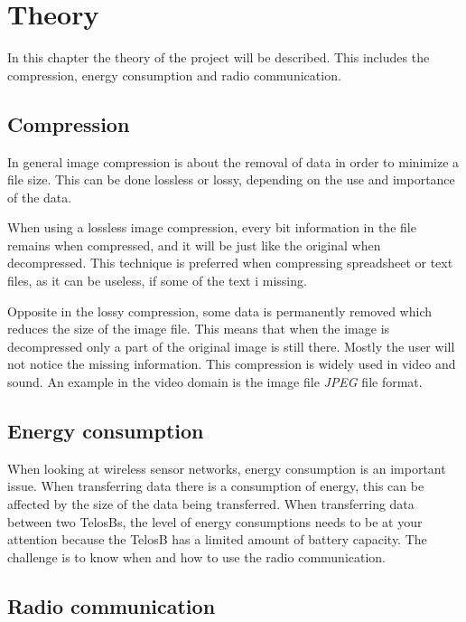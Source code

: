 \chapter{Theory}
\label{chp:theory}

In this chapter the theory of the project will be described. This includes the compression, energy consumption and radio communication.

\section{Compression}
In general image compression is about the removal of data in order to minimize a file size. This can be done lossless or lossy, depending on the use and importance of the data.

When using a lossless image compression, every bit information in the file remains when compressed, and it will be just like the original when decompressed. This technique is preferred when compressing spreadsheet or text files, as it can be useless, if some of the text i missing.

Opposite in the lossy compression, some data is permanently removed which reduces the size of the image file. This means that when the image is decompressed only a part of the original image is still there. Mostly the user will not notice the missing information. This compression is widely used in video and sound. An example in the video domain is the image file \emph{JPEG} file format.

\section{Energy consumption}
When looking at wireless sensor networks, energy consumption is an important issue. When transferring data there is a consumption of energy, this can be affected by the size of the data being transferred. When transferring data between two TelosBs, the level of energy consumptions needs to be at your attention because the TelosB has a limited amount of battery capacity. The challenge is to know when and how to use the radio communication.

\section{Radio communication}